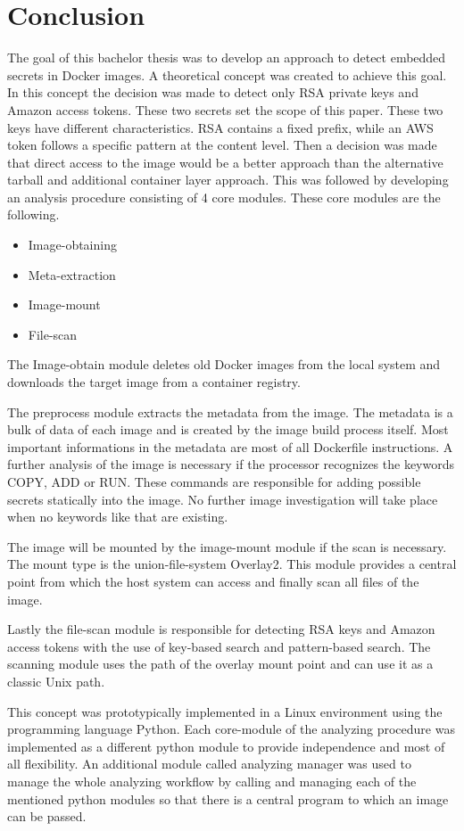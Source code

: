 \chapter{Conclusion}
\label{ch:end:conclusion}
The goal of this bachelor thesis was to develop an approach to detect embedded secrets in Docker images. 
A theoretical concept was created to achieve this goal. 
In this concept the decision was made to detect only RSA private keys and Amazon access tokens.
These two secrets set the scope of this paper. These two keys have different characteristics.
RSA contains a fixed prefix, while an AWS token follows a specific pattern at the content level.
Then a decision was made that direct access to the image would be a better approach than the alternative tarball and additional container layer approach.
This was followed by developing an analysis procedure consisting of 4 core modules.
These core modules are the following.
\begin{itemize}
\item Image-obtaining
\item Meta-extraction
\item Image-mount
\item File-scan
\end{itemize}
The Image-obtain module deletes old Docker images from the local system and downloads the target image from a container registry.

The preprocess module extracts the metadata from the image. 
The metadata is a bulk of data of each image and is created by the image build process itself.
Most important informations in the metadata are most of all Dockerfile instructions.
A further analysis of the image is necessary if the processor recognizes the keywords COPY, ADD or RUN.
These commands are responsible for adding possible secrets statically into the image. 
No further image investigation will take place when no keywords like that are existing. 

The image will be mounted by the image-mount module if the scan is necessary. The mount type is the union-file-system Overlay2.
This module provides a central point from which the host system can access and finally scan all files of the image.

Lastly the file-scan module is responsible for detecting RSA keys and Amazon access tokens with the use of key-based search and pattern-based search.
The scanning module uses the path of the overlay mount point and can use it as a classic Unix path.

This concept was prototypically implemented in a Linux environment using the programming language Python.
Each core-module of the analyzing procedure was implemented as a different python module to provide independence and most of all flexibility. 
An additional module called analyzing manager was used to manage the whole analyzing workflow by calling and managing each of the mentioned python modules so that there is a central program to which an image can be passed.

